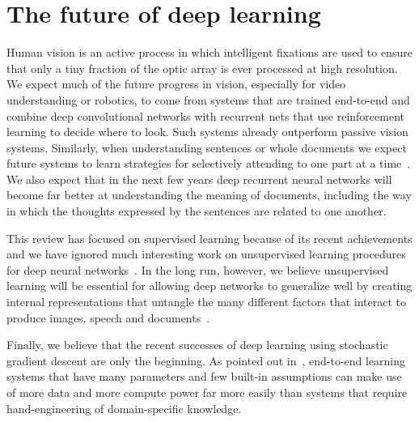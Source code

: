 \documentclass[]{article}
\begin{document}
\section{The future of deep learning}

Human vision is an active process in which intelligent fixations are used
to ensure that only a tiny fraction of the optic array is ever processed at
high resolution. We expect much of the future progress in vision,
especially for video understanding or robotics, to come from systems that
are trained end-to-end and combine deep convolutional networks with
recurrent nets that use reinforcement learning to decide where to
look\cite{}.  Such systems already outperform passive vision
systems\cite{ba+mnih}.  Similarly, when understanding sentences or whole
documents we expect future systems to learn strategies for selectively
attending to one part at a time~\cite{Bahdanau-et-al-arxiv2014}. We also expect
that in the next few years deep recurrent neural networks will become far
better at understanding the meaning of documents, including the way in
which the thoughts expressed by the sentences are related to one another.

This review has focused on supervised learning because of its recent
achievements and we have ignored much interesting work on unsupervised
learning procedures for deep neural networks~\cite{deep-boltz, wake-sleep,
  google-cat, denoising-auto, ranzato-pami, more recent}. In the long run,
however, we believe unsupervised learning will be essential for allowing
deep networks to generalize well by creating internal representations that
untangle the many different factors that interact to produce images, speech
and documents~\cite{Yann,Bengio-Courville-Vincent-TPAMI2013}.

Finally, we believe that the recent successes of deep learning using
stochastic gradient descent are only the beginning.  As pointed out
in~\citet{Bengio+Lecun-chapter2007-small}, end-to-end learning
systems that have many parameters and few built-in assumptions can make use
of more data and more compute power far more easily than systems that
require hand-engineering of domain-specific knowledge.

 
\end{document}
